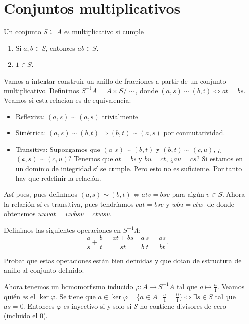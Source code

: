 \documentclass[ACGA.tex]{subfiles}
\begin{document}
\section{Conjuntos multiplicativos}

\begin{defi}
Un conjunto $S\subseteq A$ es multiplicativo si cumple
\begin{enumerate}
\item Si $a,b\in S$, entonces $ab\in S$.
\item $1\in S$.
\end{enumerate}
\end{defi}

Vamos a intentar construir un anillo de fracciones a partir de un conjunto multiplicativo. Definimos $S^{-1}A=A\times S/\sim$, donde $(a,s)\sim (b,t)\Leftrightarrow at=bs$. Veamos si esta relación es de equivalencia:
\begin{itemize}
\item Reflexiva: $(a,s)\sim (a,s)$ trivialmente
\item Simétrica: $(a,s)\sim (b,t)\Rightarrow (b,t)\sim (a,s)$ por conmutatividad.
\item Transitiva: Supongamos que $(a,s)\sim (b,t)$ y $(b,t)\sim (c,u)$, ¿$(a,s)\sim (c,u)$? Tenemos que $at=bs$ y $bu=ct$, ¿$au=cs$? Si estamos en un dominio de integridad sí se cumple. Pero esto no es suficiente. Por tanto hay que redefinir la relación.
\end{itemize}

Así pues, pues definimos $(a,s)\sim (b,t)\Leftrightarrow atv=bsv$ para algún $v\in S$. Ahora la relación sí es transitiva, pues tendríamos $vat=bsv$ y $wbu=ctw$, de donde obtenemos $uwvat=uwbsv=ctwsv$. 

Definimos las siguientes operaciones en $S^{-1}A$:
$$\frac{a}{s}+\frac{b}{t}=\frac{at+bs}{st}\quad \frac{a}{b}\frac{s}{t}=\frac{as}{bt}.$$

\begin{ejer}
Probar que estas operaciones están bien definidas y que dotan de estructura de anillo al conjunto definido.
\end{ejer}


Ahora tenemos un homomorfismo inducido $\varphi: A\to S^{-1}A$ tal que $a\mapsto \frac{a}{1}$. Veamos quién es el $\ker{\varphi}$. Se tiene que $a\in\ker{\varphi}=\{a\in A\mid \frac{a}{1}=\frac{0}{1}\}\Leftrightarrow \exists s\in S$ tal que $as=0$. Entonces $\varphi$ es inyectivo si y solo si $S$ no contiene divisores de cero (incluido el 0).
\end{document}
